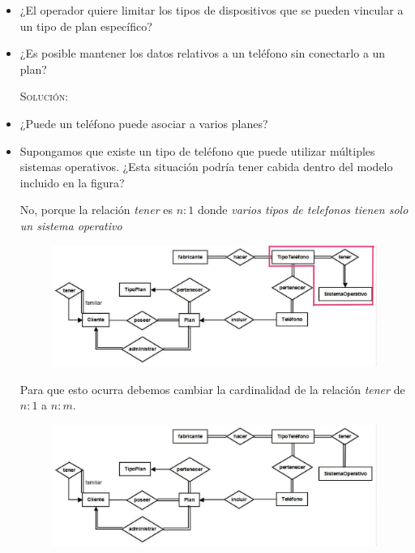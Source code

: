 \documentclass[letterpaper,11pt]{article}
\begin{document}
\begin{itemize}
    \item ¿El operador quiere limitar los tipos de dispositivos que se pueden 
    vincular a un tipo de plan específico?

    \item ¿Es posible mantener los datos relativos a un teléfono sin conectarlo
    a un plan?

    \textsc{Solución:}

    \item ¿Puede un teléfono puede asociar a varios planes?
    
    \item Supongamos que existe un tipo de teléfono que puede utilizar múltiples
    sistemas operativos. ¿Esta situación podría tener cabida dentro del modelo 
    incluido en la figura?

    No, porque la relación \textit{tener} es $n:1$ donde \textit{varios tipos de 
    telefonos tienen solo un sistema operativo}

    \begin{figure}[H]
        \centering
        \includegraphics[scale=0.4]{./imagenes/modelo7a.jpg}
    \end{figure}

    Para que esto ocurra debemos cambiar la cardinalidad de la relación 
    \textit{tener} de $n:1$ a $n:m$.
    \begin{figure}[H]
        \centering
        \includegraphics[scale=0.4]{./imagenes/modelo7b.jpg}
    \end{figure}


\end{itemize}
\end{document}

